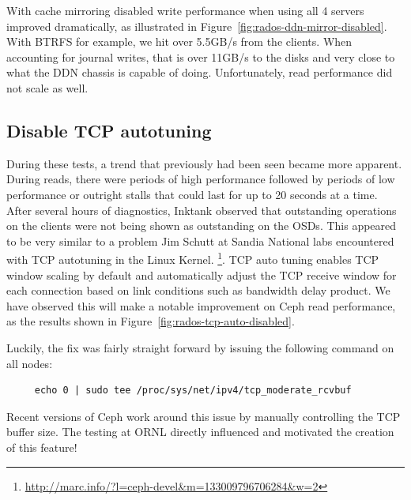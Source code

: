 \documentclass{article}
\begin{document}
With cache mirroring disabled write performance when using all 4 servers
improved dramatically, as illustrated in
Figure~\ref{fig:rados-ddn-mirror-disabled}. With BTRFS for example, we hit over
5.5GB/s from the clients.  When accounting for journal writes, that is over
11GB/s to the disks and very close to what the DDN chassis is capable of doing. 
Unfortunately, read performance did not scale as well.


\subsection{Disable TCP autotuning}

During these tests, a trend that previously had been seen became more apparent.
During reads, there were periods of high performance followed by periods of low
performance or outright stalls that could last for up to 20 seconds at a time. 
After several hours of diagnostics, Inktank observed that outstanding operations
on the clients were not being shown as outstanding on the OSDs.  This appeared
to be very similar to a problem Jim Schutt at Sandia National labs encountered
with TCP autotuning in the Linux Kernel.
\footnote{\url{http://marc.info/?l=ceph-devel&m=133009796706284&w=2}}.
TCP auto tuning enables TCP window scaling by default and automatically adjust
the TCP receive window for each connection based on link conditions such as
bandwidth delay product. We have observed this will make a notable improvement
on Ceph read performance, as the results shown in
Figure~\ref{fig:rados-tcp-auto-disabled}.


Luckily, the fix was fairly straight forward by issuing the following command on all nodes:

\begin{Verbatim}
     echo 0 | sudo tee /proc/sys/net/ipv4/tcp_moderate_rcvbuf
\end{Verbatim}

Recent versions of Ceph work around this issue by manually controlling the TCP
buffer size.  The testing at ORNL directly influenced and motivated the creation
of this feature!
\end{document}
